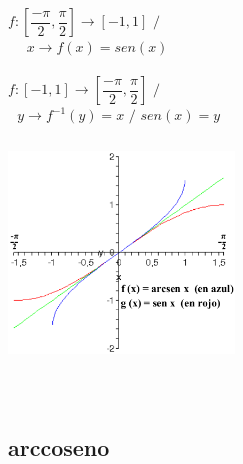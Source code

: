 \hfill
\begin{minipage}{.45\textwidth}

\begin{center}
$f:\left[ \dfrac{-\pi}{2},\dfrac{\pi}{2} \right] \longrightarrow [-1,1] $ $/$ \qquad $ $\\
$ $ \qquad $ $ \qquad $ $ \qquad $ $ \qquad $ x \longrightarrow f(x) = sen(x)$\\
\qquad \\

$f: [-1,1] \longrightarrow \left[ \dfrac{-\pi}{2}, \dfrac{\pi}{2} \right] $ $/$ \qquad $ $\\
$ $ \qquad $ $ \qquad $ y \longrightarrow f^{-1}(y) = x$ $/$ $ sen(x)=y$\\
\end{center}

\end{minipage}
\hfill 
\begin{minipage}{.50\textwidth}

\includegraphics[height=6cm,width=6cm]{arcsen.eps}

\end{minipage}
\hfill \\

\subsection{arccoseno}

